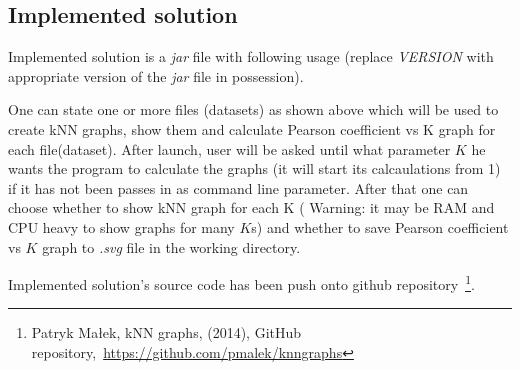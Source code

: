\subsection{Implemented solution}
Implemented solution is a \emph{jar} file with following usage (replace \emph{VERSION} with appropriate version of the \emph{jar} file in possession).


One can state one or more files (datasets) as shown above which will be used to create kNN graphs, show them and calculate Pearson coefficient vs K graph for each file(dataset).
After launch, user will be asked until what parameter $K$ he wants the program to calculate the graphs (it will start its calcaulations from 1) if it has not been passes in as command line parameter.
After that one can choose whether to show kNN graph for each K ( Warning: it may be RAM and CPU heavy to show graphs for many $K$s) and whether to save Pearson coefficient vs $K$ graph to \emph{.svg} file in the working directory.

Implemented solution's source code has been push onto github repository~\footnote{Patryk Małek, kNN graphs, (2014), GitHub repository,~\url{https://github.com/pmalek/knngraphs}}.